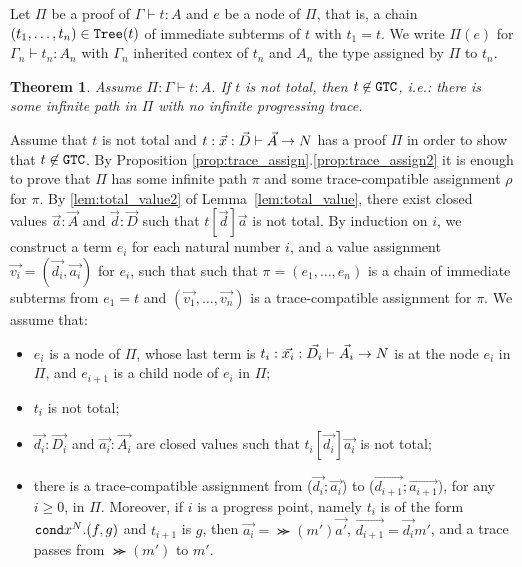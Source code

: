 \documentclass{article}
\newtheorem{theorem}{Theorem}[section]
\newenvironment{proof}[1][Proof]{\begin{trivlist}
\item[\hskip \labelsep {\bfseries #1}]}{\end{trivlist}}
\begin{document}

Let $\Pi$ be a proof of $\Gamma\vdash t:A$ and $e$ be a node of $\Pi$, that is, a chain  
$(t_1, \ldots, t_n) \in {\tt Tree}(t)$ of immediate
subterms of $t$ with $t_1 = t$.
We write $\Pi(e)$ for $\Gamma_n\vdash t_n:A_n$ with $\Gamma_n$ inherited contex of 
$t_n$ and $A_n$ the type assigned by $\Pi$ to $t_n$.

\begin{theorem}
  Assume $\Pi:\Gamma\vdash t:A$.
  If $t$ is \emph{not} total, then $t \not \in {\tt GTC}$, i.e.:
  there is some infinite path in $\Pi$ with no infinite progressing trace. 
\end{theorem}


\begin{proof}
  Assume that $t$ is not total
  and $t: \vec{x}:\vec{D}\vdash\vec{A}\rightarrow{N}$ 
  has a proof $\Pi$ in order to show that $t \not \in {\tt GTC}$.
  By Proposition \ref{prop:trace_assign}.\ref{prop:trace_assign2} it is enough to prove that
  $\Pi$ has some infinite path $\pi$ and some trace-compatible assignment $\rho$ for $\pi$.
  By \ref{lem:total_value2} of Lemma~\ref{lem:total_value},
  there exist closed values $\vec{a}:\vec{A}$ and $\vec{d}:\vec{D}$ such that
  $t[\vec{d}]\vec{a}$ is not total. 
  By induction on $i$, we construct a term $e_i$ for each natural number $i$,
  and a value assignment $\vec{v_i} = (\vec{d_i},\vec{a_i})$ for $e_i$, such that 
  such that $\pi=(e_1, \ldots, e_n)$ is a chain of immediate subterms from $e_1  = t$
  and $(\vec{v_1},\ldots,\vec{v_n})$ is a trace-compatible assignment for $\pi$.
  We assume that:
  \begin{itemize}
  \item[(i)]
    $e_i$ is a node of $\Pi$, whose last term is 
    $t_i: \vec{x_i}:\vec{D_i}\vdash\vec{A_i}\rightarrow{N}$ is
    at the node $e_i$ in $\Pi$, and $e_{i+1}$ is a child node of $e_i$ in $\Pi$; 
  \item[(ii)]
    $t_i$ is not total;
  \item[(iii)]
    $\vec{d_i}:\vec{D_i}$ and $\vec{a_i}:\vec{A_i}$ are closed values
    such that $t_i[\vec{d_i}]\vec{a_i}$ is not total;
  \item[(iv)]
    there is a trace-compatible assignment from
    ($\vec{d_i};\vec{a_i}$) to ($\vec{d_{i+1}};\vec{a_{i+1}}$), for any $i\ge 0$, in $\Pi$.
    Moreover, if $i$ is a progress point, namely $t_i$ is of the form ${\tt cond} x^{N}.(f,g)$ and $t_{i+1}$ is $g$,
    then $\vec{a_i} = \Succ(m')\vec{a'}$, $\vec{d_{i+1}} = \vec{d_i}m'$, and
    a trace passes from $\Succ(m')$ to $m'$. 
  \end{itemize}
  

\end{proof}
\end{document}

